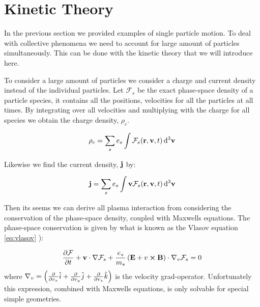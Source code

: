 \section{Kinetic Theory}
	In the previous section we provided examples of single particle motion. To deal with collective
	phenomena we need to account for large amount of particles simultaneously.
	This can be done with the kinetic theory that we will introduce here.

	To consider a large amount of particles we consider a charge and current density
	instead of the individual particles.
	Let \(\mathcal{F}_s\) be the exact phase-space density of a particle species,
	it contains all the positions, velocities for all the particles at
	all times. By integrating over all velocities and multiplying with the charge
	for all species we obtain the charge density, \(\rho_c\).

	\[\rho_c = \sum_s e_s \int \mathcal{F}_s(\vb{r},\vb{v},t)\dd[3]{\vb{v}}\]

	Likewise we find the current density, \(\vb{j}\) by:

	\[\vb{j} = \sum_s e_s \int \vb{v}\mathcal{F}_s(\vb{r},\vb{v},t)\dd[3]{\vb{v}}\]

	Then its seems we can derive all plasma interaction from considering
	the conservation of the phase-space density, coupled with Maxwells equations.
	The phase-space conservation is given by what is known as the Vlasov equation \cref{eq:vlasov}
	\citep{pecseli_waves_2012}):

	\begin{align}
		\pdv{\mathcal{F}}{t} + \vb{v}\cdot\nabla\mathcal{F}_s + \frac{e_s}{m_s}\left( \vb{E} + v\cross\vb{B} \right) \cdot \nabla_v\mathcal{F}_s = 0 \label{eq:vlasov}
	\end{align}
	where \(\nabla_v = \left(\pdv{v_x} \hat{i} + \pdv{v_y} \hat{j} + \pdv{v_z} \hat{k}\right)\) is the velocity grad-operator.
	Unfortunately this expression, combined with Maxwells equations, is only solvable
	for special simple geometries.
